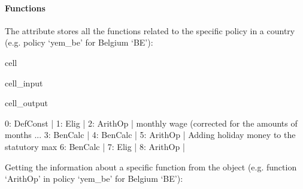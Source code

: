 \documentclass[letterpaper,10pt,english]{sphinxmanual}
\begin{document}
\paragraph{Functions}
\label{\detokenize{userguide:functions}}
\sphinxAtStartPar
The attribute  stores all the functions related to the specific policy in a country (e.g. policy ‘yem\_be’ for Belgium ‘BE’):

\begin{sphinxuseclass}{cell}
\begin{sphinxuseclass}{cell_input}
\begin{sphinxVerbatim}[commandchars=\\\{\}]
\PYG{p}{[}\PYG{p}{]}\PYG{p}{[}\PYG{p}{]}
\end{sphinxVerbatim}

\end{sphinxuseclass}
\begin{sphinxuseclass}{cell_output}
\begin{sphinxVerbatim}[commandchars=\\\{\}]
0: DefConst    |     
1: Elig        |     
2: ArithOp     |    monthly wage (corrected for the amounts of months  ... 
3: BenCalc     |     
4: BenCalc     |     
5: ArithOp     |    Adding holiday money to the statutory max 
6: BenCalc     |     
7: Elig        |     
8: ArithOp     |     
\end{sphinxVerbatim}

\end{sphinxuseclass}
\end{sphinxuseclass}
\sphinxAtStartPar
Getting the information about a specific function from the  object (e.g. function ‘ArithOp’ in policy ‘yem\_be’ for Belgium ‘BE’):
\end{document}
